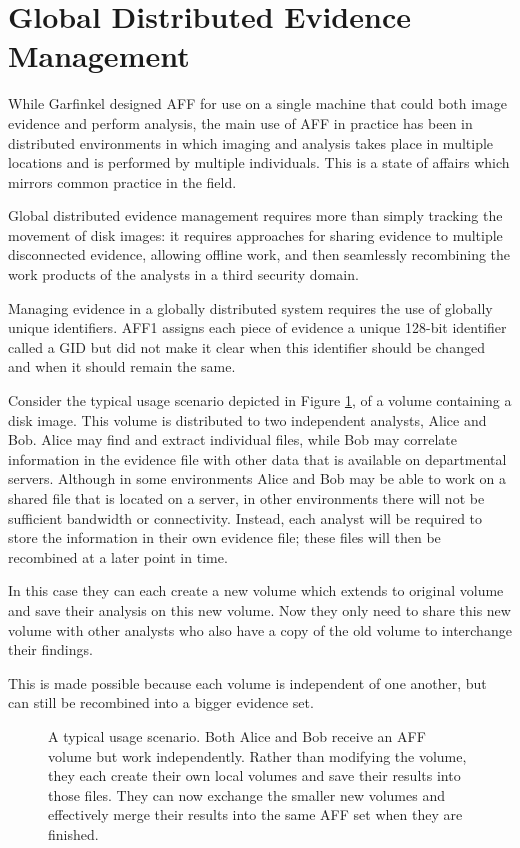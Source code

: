 \documentclass[10pt, conference]{IEEEtran}
\begin{document}
\section{Global Distributed Evidence Management}
While Garfinkel designed AFF for use on a single machine that could
both image evidence and perform analysis, the main use of AFF in
practice has been in distributed environments in which imaging and
analysis takes place in multiple locations and is performed by
multiple individuals. This is a state of affairs which mirrors common
practice in the field. 

Global distributed evidence management requires
more than simply tracking the movement of disk images: it requires
approaches for sharing evidence to multiple disconnected
evidence, allowing offline work, and then seamlessly recombining the
work products of the analysts in a third security domain.

Managing evidence in a globally distributed system requires the use of
globally unique identifiers. AFF1 assigns
each piece of evidence a unique 128-bit identifier called a GID but did
not make it clear when this identifier should be changed and when it
should remain the same. 

Consider the typical usage scenario depicted in Figure \ref{usage}, of
a volume containing a disk image. This volume is distributed to two
independent analysts, Alice and Bob. Alice may find and extract
individual files, while Bob may correlate information in the evidence
file with other data that is available on departmental
servers. Although in some environments Alice and Bob may be able to
work on a shared file that is located on a server, in other
environments there will not be sufficient bandwidth or
connectivity. Instead, each analyst will be required to store the
information in their own evidence file; these files will then be
recombined at a later point in time.

In this case they can each create a new volume which extends to
original volume and save their analysis on this new volume. Now they
only need to share this new volume with other analysts who also have a
copy of the old volume to interchange their findings.

This is made possible because each volume is independent of one
another, but can still be recombined into a bigger evidence set. 

\begin{figure}[tb]
  \begin{center}
  \mbox{\columnwidth {}}
  \caption{A typical usage scenario. Both Alice and Bob receive an AFF
  volume but work independently. Rather than modifying the volume,
  they each create their own local volumes and save their results into
  those files. They can now exchange the smaller new volumes and
  effectively merge their results into the same AFF set when they are finished.}
  \label{usage}
  \end{center}
\end{figure}
\end{document}
